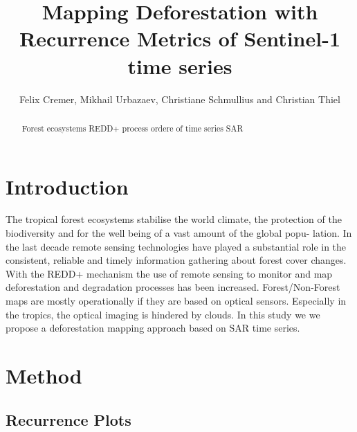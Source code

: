 \documentclass{article}
\title{Mapping Deforestation with Recurrence Metrics of Sentinel-1 time series}
\author{Felix Cremer, Mikhail Urbazaev, Christiane Schmullius and Christian Thiel}
\begin{document}
\maketitle
\begin{abstract}
  Forest ecosystems
  REDD+ process
  ordere of time series
  SAR

%
\end{abstract}
\section{Introduction}
The tropical forest ecosystems stabilise the world climate\cite{}, the protection of the biodiversity \cite{} and
for the well being of a vast amount of the global popu-
lation\cite{}.
 In the last decade remote sensing technologies have
played a substantial role in the consistent, reliable and timely
information gathering about forest cover changes. With the
REDD+ mechanism the use of remote sensing to monitor
and map deforestation and degradation processes has been
increased. Forest/Non-Forest maps are mostly operationally if
they are based on optical sensors. Especially in the tropics,
the optical imaging is hindered by clouds. In this study we
we propose a deforestation mapping approach based on SAR time
series.

\section{Method}

\subsection{Recurrence Plots}
\end{document}
